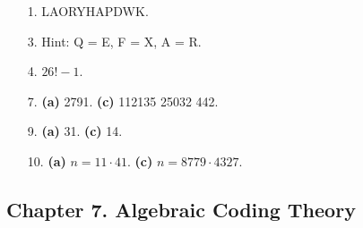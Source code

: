 {\small
\begin{itemize}
 
 
\bf\item[1.]\rm
LAORYHAPDWK.
 
 
\bf\item[3.]\rm
Hint: Q = E, F = X, A = R. 
 
\bf\item[4.]\rm
$26! -1$.
 
\bf\item[7.]\rm
{\bf (a)}  2791.
{\bf (c)}  112135 25032 442.
 
\bf\item[9.]\rm
{\bf (a)} 31.
{\bf (c)} 14.
 
 
 
\bf\item[10.]\rm
{\bf (a)} $n = 11 \cdot 41$.
{\bf (c)} $n = 8779 \cdot 4327$.
 
 
\end{itemize}
}
 
\subsection*{Chapter 7. Algebraic Coding Theory}
 
